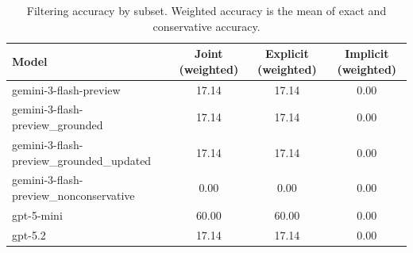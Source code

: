 \begin{table}[t]
    \centering
    \begin{tabular}{lccc}
        \toprule
        Model & Joint (weighted) & Explicit (weighted) & Implicit (weighted) \\
        \midrule
        gemini-3-flash-preview & 17.14 & 17.14 & 0.00 \\
        gemini-3-flash-preview_grounded & 17.14 & 17.14 & 0.00 \\
        gemini-3-flash-preview_grounded_updated & 17.14 & 17.14 & 0.00 \\
        gemini-3-flash-preview_nonconservative & 0.00 & 0.00 & 0.00 \\
        gpt-5-mini & 60.00 & 60.00 & 0.00 \\
        gpt-5.2 & 17.14 & 17.14 & 0.00 \\
        \bottomrule
    \end{tabular}
    \caption{Filtering accuracy by subset. Weighted accuracy is the mean of exact and conservative accuracy.}
    \label{tab:filtering-eval}
\end{table}
